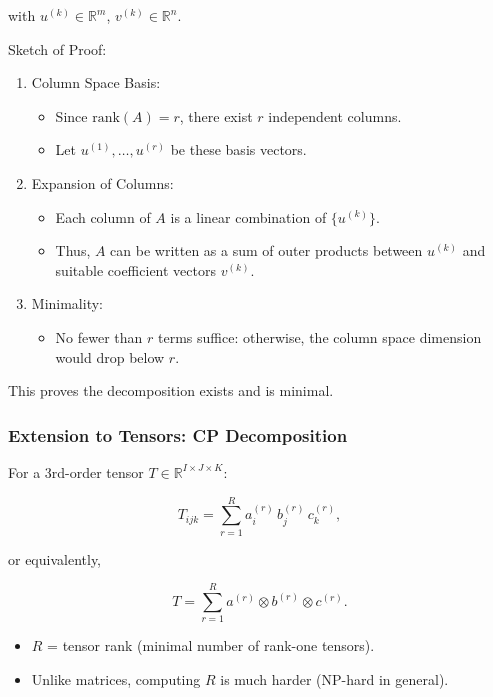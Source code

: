 \documentclass[
  letterpaper,
  DIV=11,
  numbers=noendperiod]{scrreprt}
\providecommand{\tightlist}{%
  \setlength{\itemsep}{0pt}\setlength{\parskip}{0pt}}
\begin{document}
with \(u^{(k)} \in \mathbb{R}^m\), \(v^{(k)} \in \mathbb{R}^n\).

Sketch of Proof:

\begin{enumerate}
\def\labelenumi{\arabic{enumi}.}
\item
  Column Space Basis:

  \begin{itemize}
  \tightlist
  \item
    Since \(\text{rank}(A) = r\), there exist \(r\) independent columns.
  \item
    Let \(u^{(1)}, \dots, u^{(r)}\) be these basis vectors.
  \end{itemize}
\item
  Expansion of Columns:

  \begin{itemize}
  \tightlist
  \item
    Each column of \(A\) is a linear combination of \(\{u^{(k)}\}\).
  \item
    Thus, \(A\) can be written as a sum of outer products between
    \(u^{(k)}\) and suitable coefficient vectors \(v^{(k)}\).
  \end{itemize}
\item
  Minimality:

  \begin{itemize}
  \tightlist
  \item
    No fewer than \(r\) terms suffice: otherwise, the column space
    dimension would drop below \(r\).
  \end{itemize}
\end{enumerate}

This proves the decomposition exists and is minimal.

\subsubsection{Extension to Tensors: CP
Decomposition}\label{extension-to-tensors-cp-decomposition}

For a 3rd-order tensor \(T \in \mathbb{R}^{I \times J \times K}\):

\[
T_{ijk} = \sum_{r=1}^R a^{(r)}_i \, b^{(r)}_j \, c^{(r)}_k,
\]

or equivalently,

\[
T = \sum_{r=1}^R a^{(r)} \otimes b^{(r)} \otimes c^{(r)}.
\]

\begin{itemize}
\tightlist
\item
  \(R\) = tensor rank (minimal number of rank-one tensors).
\item
  Unlike matrices, computing \(R\) is much harder (NP-hard in general).
\end{itemize}
\end{document}

